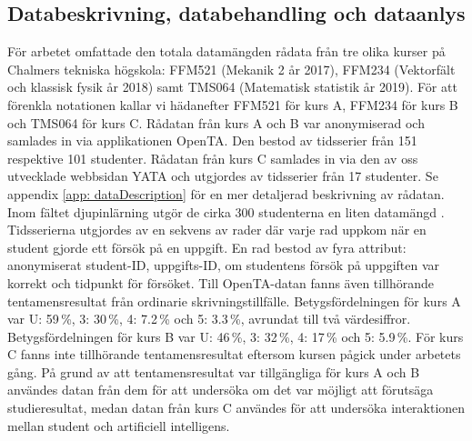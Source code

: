\subsection{Databeskrivning, databehandling och dataanlys}
\label{sec:DDD}






%       





För arbetet omfattade den totala datamängden rådata från tre olika kurser på Chalmers tekniska högskola: FFM521 (Mekanik 2 år 2017), FFM234 (Vektorfält och klassisk fysik år 2018) samt TMS064 (Matematisk statistik år 2019). För att förenkla notationen kallar vi hädanefter FFM521 för kurs A, FFM234 för kurs B och TMS064 för kurs C. Rådatan från kurs A och B var anonymiserad och samlades in via applikationen OpenTA. Den bestod av tidsserier från 151 respektive 101 studenter. Rådatan från kurs C samlades in via den av oss utvecklade webbsidan YATA och utgjordes av tidsserier från 17 studenter. Se appendix \ref{app: dataDescription} för en mer detaljerad beskrivning av rådatan. Inom fältet djupinlärning utgör de cirka 300 studenterna en liten datamängd \cite{Chollet}. Tidsserierna utgjordes av en sekvens av rader där varje rad uppkom när en student gjorde ett försök på en uppgift. En rad bestod av fyra attribut: anonymiserat student-ID, uppgifts-ID, om studentens försök på uppgiften var korrekt och tidpunkt för försöket. Till OpenTA-datan fanns även tillhörande tentamensresultat från ordinarie skrivningstillfälle. Betygsfördelningen för kurs A var U: 59\,\%, 3: 30\,\%, 4: 7.2\,\% och 5: 3.3\,\%, avrundat till två värdesiffror. Betygsfördelningen för kurs B var U: 46\,\%, 3: 32\,\%, 4: 17\,\% och 5: 5.9\,\%. För kurs C fanns inte tillhörande tentamensresultat eftersom kursen pågick under arbetets gång. På grund av att tentamensresultat var tillgängliga för kurs A och B användes datan från dem för att undersöka om det var möjligt att förutsäga studieresultat, medan datan från kurs C användes för att undersöka interaktionen mellan student och artificiell intelligens.

